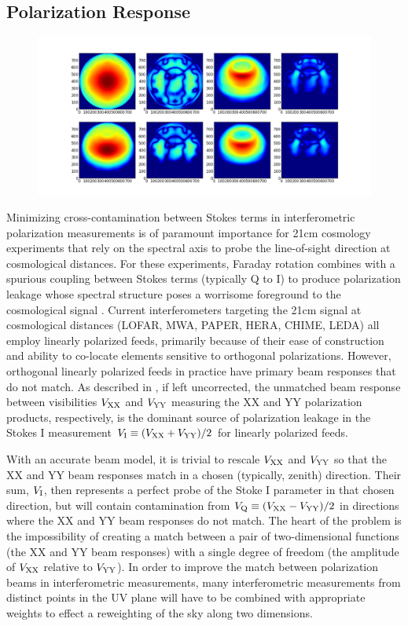 \documentclass[twocolumn,apj,numberedappendix]{emulateapj}
\begin{document}
\subsection{Polarization Response}
\label{sec:polbeams}
\def\VXX{{V_{\rm XX}}}
\def\VYY{{V_{\rm YY}}}
\def\VI{{V_{\rm I}}}
\def\VQ{{V_{\rm Q}}}

\begin{figure}\centering
\includegraphics[width=.9\columnwidth]{plots/fringe_beam_wgts.png}
\caption{
}\label{fig:fringe_beam_wgts}
\end{figure}


Minimizing cross-contamination between Stokes terms in interferometric polarization measurements
is of paramount importance for 21cm cosmology experiments that rely on
the spectral axis to probe the line-of-sight direction at cosmological distances.  For these
experiments, Faraday rotation combines
with a spurious coupling between Stokes terms (typically Q to I) to produce polarization leakage whose 
spectral structure poses a worrisome foreground
to the cosmological signal \citep{jelic_et_al2008,bernardi,moore_et_al2013,moore_et_al2015}.  Current interferometers
targeting the 21cm signal at cosmological distances (LOFAR, MWA, PAPER, HERA, CHIME, LEDA) all employ linearly
polarized feeds, primarily because of their ease of construction and ability to co-locate elements sensitive to
orthogonal polarizations.  However, orthogonal linearly polarized feeds in practice have primary beam responses
that do not match.  As described in \citet{moore_et_al2013}, if left uncorrected, the unmatched beam response 
between visibilities $\VXX$ and $\VYY$ measuring the XX and YY polarization products, respectively, is the 
dominant source of polarization leakage in the Stokes I measurement $\VI\equiv(\VXX+\VYY)/2$ for
linearly polarized feeds.

With an accurate beam model, it is trivial to rescale $\VXX$ and $\VYY$ 
so that the XX and YY beam responses match in a chosen (typically, zenith) direction.  Their sum, $\VI$, then
represents a perfect probe of the Stoke I parameter in that chosen direction, but will contain contamination
from $\VQ\equiv(\VXX-\VYY)/2$ in directions where the XX and YY beam responses do not match.
The heart of the problem is the impossibility of creating a match between a pair of two-dimensional functions (the
XX and YY beam responses) with a single degree of freedom (the amplitude of $\VXX$ relative to $\VYY$).  In order
to improve the match between polarization beams in interferometric measurements, many interferometric measurements
from distinct points in the UV plane will have to be combined with appropriate weights to effect a reweighting
of the sky along two dimensions.
\end{document}
